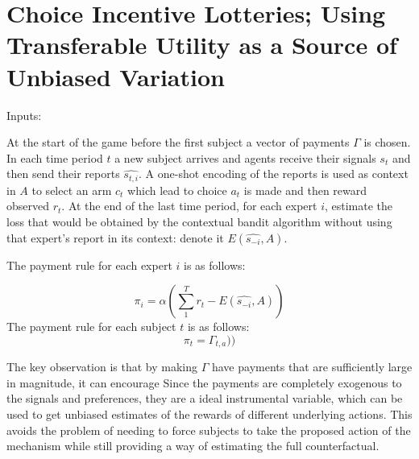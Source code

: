 
\section{Choice Incentive Lotteries;  Using Transferable Utility as a Source of Unbiased Variation}


\begin{mech}
Inputs:
 
 At the start of the game before the first subject a vector of payments $\Gamma$ is chosen.
In each time period $t$ a new subject arrives and agents receive their signals $s_t$ and then send their reports $\hat{s_{t,i}}$. A one-shot encoding of the reports is used as context in $A$ to select an arm $c_t$ which lead to choice $a_t$ is made and then reward observed $r_t$.
At the end of the last time period, for each expert $i$, estimate the loss that would be obtained by the contextual bandit algorithm without using that expert's report in its context: denote it $E(\hat{s_{-i}},A)$.



The payment rule for each expert $i$ is as follows:

\[
    \pi_i =  \alpha (\sum_1^T r_t -  E(\hat{s_{-i}},A))
\]
The payment rule for each subject $t$ is as follows:
\[
    \pi_t =  \Gamma_{t,a}))
\]


\end{mech}

The key observation is that by making $\Gamma$ have payments that are sufficiently large in magnitude, it can encourage 
Since the payments are completely exogenous to the signals and preferences, they are a ideal instrumental variable, which can be used to get unbiased estimates of the rewards of different underlying actions.
This avoids the problem of needing to force subjects to take the proposed action of the mechanism while still providing a way of estimating the full counterfactual.






